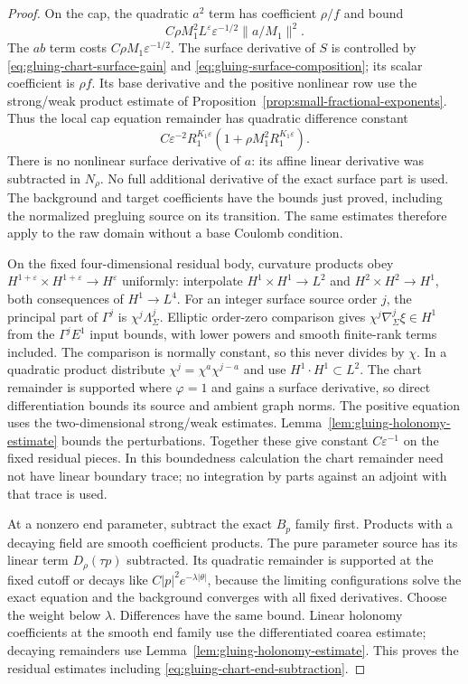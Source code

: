 \documentclass[11pt]{amsart}
\theoremstyle{definition}
\theoremstyle{remark}
\theoremstyle{plain}
\begin{document}
\begin{proof}
On the cap, the quadratic $a^2$ term has coefficient $\rho/f$
and bound
\[
                 C\rho M_1^2L^\varepsilon
                           \varepsilon^{-1/2}\|a/M_1\|^2.
\]
The $ab$ term costs
$C\rho M_1\varepsilon^{-1/2}$. The surface derivative of
$S$ is controlled by \eqref{eq:gluing-chart-surface-gain} and
\eqref{eq:gluing-surface-composition}; its scalar coefficient is
$\rho f$. Its base derivative and the positive nonlinear row
use the strong/weak product estimate of
Proposition~\ref{prop:small-fractional-exponents}. Thus the local
cap equation remainder has quadratic difference constant
\begin{equation}\label{eq:gluing-local-cap-nonlinearity}
 C\varepsilon^{-2}R_1^{K_1\varepsilon}
                         (1+\rho M_1^2R_1^{K_1\varepsilon}).
\end{equation}
There is no nonlinear surface derivative of $a$: its affine
linear derivative was subtracted in $N_\rho$. No full additional
derivative of the exact surface part is used. The background and
target coefficients have the bounds just proved, including the
normalized pregluing source on its transition. The same estimates
therefore apply to the raw domain without a base Coulomb condition.

On the fixed four-dimensional residual body, curvature products obey
$H^{1+\varepsilon}\times H^{1+\varepsilon}\to H^\varepsilon$
uniformly: interpolate $H^1\times H^1\to L^2$ and
$H^2\times H^2\to H^1$, both consequences of $H^1\to L^4$.
For an integer surface source order $j$, the principal part of
$\Gamma^j$ is $\chi^j\Lambda_\Sigma^j$. Elliptic order-zero
comparison gives $\chi^j\nabla_\Sigma^j\xi\in H^1$
from the $\Gamma^jE^1$ input bounds, with lower powers and
smooth finite-rank terms included. The comparison is normally
constant, so this never divides by $\chi$. In a quadratic
product distribute $\chi^j=\chi^a\chi^{j-a}$ and use
$H^1\cdot H^1\subset L^2$. The chart remainder is supported
where $\varphi=1$ and gains a surface derivative, so direct
differentiation bounds its source and ambient graph norms. The
positive equation uses the two-dimensional strong/weak estimates.
Lemma~\ref{lem:gluing-holonomy-estimate} bounds the perturbations.
Together these give constant $C\varepsilon^{-1}$ on the fixed
residual pieces. In this boundedness calculation the chart remainder
need not have linear boundary trace; no integration by parts against
an adjoint with that trace is used.

At a nonzero end parameter, subtract the exact $B_p$ family first.
Products with a decaying field are smooth coefficient products.
The pure parameter source has its linear term
$D_\rho(\tau p)$ subtracted. Its quadratic remainder is supported
at the fixed cutoff or decays like $C|p|^2e^{-\lambda|\theta|}$,
because the limiting configurations solve the exact equation and
the background converges with all fixed derivatives. Choose the
weight below $\lambda$. Differences have the same bound.
Linear holonomy coefficients at the smooth end family use the
differentiated coarea estimate; decaying remainders use
Lemma~\ref{lem:gluing-holonomy-estimate}. This proves the residual
estimates including \eqref{eq:gluing-chart-end-subtraction}.


\end{proof}
\end{document}

